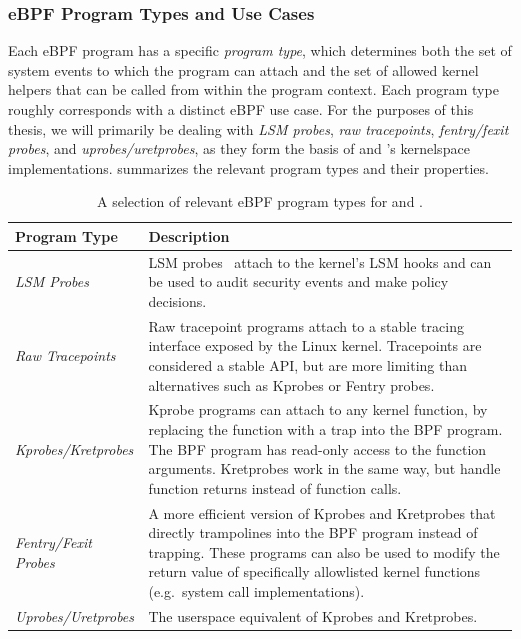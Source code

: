 \subsubsection*{eBPF Program Types and Use Cases}

Each eBPF program has a specific \textit{program type}, which determines both the set of
system events to which the program can attach and the set of allowed kernel helpers that
can be called from within the program context. Each program type roughly corresponds with
a distinct eBPF use case. For the purposes of this thesis, we will primarily be dealing
with \textit{LSM probes}, \textit{raw tracepoints}, \textit{fentry/fexit probes}, and
\textit{uprobes/uretprobes}, as they form the basis of \bpfbox{} and \bpfcontain{}'s
kernelspace implementations.  summarizes the relevant program types
and their properties.

\begingroup\footnotesize
\begin{longtable}[c]{lp{4.2in}}
\caption{A selection of relevant eBPF program types for \bpfbox{} and \bpfcontain{}.}%
\label{tab:program-types}\\
  \toprule
  Program Type & Description\\
  \midrule
  \textit{LSM Probes}          & LSM probes~\cite{singh2019_krsi} attach to the kernel's LSM hooks and can be used to audit security events and make policy decisions.\\
  \textit{Raw Tracepoints}     & Raw tracepoint programs attach to a stable tracing interface exposed by the Linux kernel. Tracepoints are considered a stable API, but are more limiting than alternatives such as Kprobes or Fentry probes.\\
  \textit{Kprobes/Kretprobes}  & Kprobe programs can attach to any kernel function, by replacing the function with a trap into the BPF program. The BPF program has read-only access to the function arguments. Kretprobes work in the same way, but handle function returns instead of function calls.\\
  \textit{Fentry/Fexit Probes} & A more efficient version of Kprobes and Kretprobes that directly trampolines into the BPF program instead of trapping. These programs can also be used to modify the return value of specifically allowlisted kernel functions (e.g.~system call implementations).\\
  \textit{Uprobes/Uretprobes}  & The userspace equivalent of Kprobes and Kretprobes.\\
  \bottomrule
\end{longtable}
\endgroup

